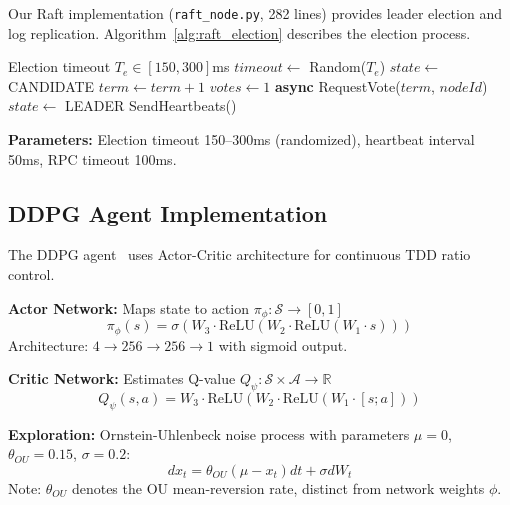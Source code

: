 \documentclass[journal]{IEEEtran}
\begin{document}
Our Raft implementation (\texttt{raft\_node.py}, 282 lines) provides leader election and log replication. Algorithm~\ref{alg:raft_election} describes the election process.

\begin{algorithm}[t]
\caption{Raft Leader Election}
\label{alg:raft_election}
\begin{algorithmic}[1]
\REQUIRE Election timeout $T_e \in [150, 300]$ms
\STATE $timeout \gets$ Random($T_e$)
        \STATE $state \gets$ CANDIDATE
        \STATE $term \gets term + 1$
        \STATE $votes \gets 1$ 
            \STATE \textbf{async} RequestVote($term$, $nodeId$)
        \ENDFOR
            \STATE $state \gets$ LEADER
            \STATE SendHeartbeats()
        \ENDIF
    \ENDIF
\ENDWHILE
\end{algorithmic}
\end{algorithm}

\textbf{Parameters:} Election timeout 150--300ms (randomized), heartbeat interval 50ms, RPC timeout 100ms.

\subsection{DDPG Agent Implementation}
\label{sec:ddpg}

The DDPG agent~\cite{ddpg2016} uses Actor-Critic architecture for continuous TDD ratio control.

\textbf{Actor Network:} Maps state to action $\pi_\phi: \mathcal{S} \to [0, 1]$
\begin{equation}
\pi_\phi(s) = \sigma(W_3 \cdot \text{ReLU}(W_2 \cdot \text{ReLU}(W_1 \cdot s)))
\end{equation}
Architecture: $4 \to 256 \to 256 \to 1$ with sigmoid output.

\textbf{Critic Network:} Estimates Q-value $Q_\psi: \mathcal{S} \times \mathcal{A} \to \mathbb{R}$
\begin{equation}
Q_\psi(s, a) = W_3 \cdot \text{ReLU}(W_2 \cdot \text{ReLU}(W_1 \cdot [s; a]))
\end{equation}

\textbf{Exploration:} Ornstein-Uhlenbeck noise process with parameters $\mu=0$, $\theta_{OU}=0.15$, $\sigma=0.2$:
\begin{equation}
dx_t = \theta_{OU}(\mu - x_t)dt + \sigma dW_t
\end{equation}
Note: $\theta_{OU}$ denotes the OU mean-reversion rate, distinct from network weights $\phi$.
\end{document}
